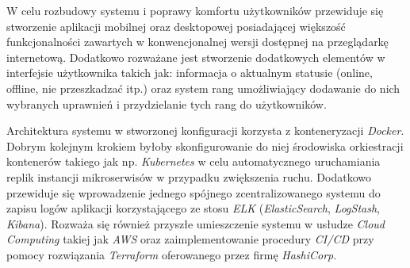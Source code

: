 
W celu rozbudowy systemu i poprawy komfortu użytkowników przewiduje się stworzenie aplikacji mobilnej oraz desktopowej
posiadającej większość funkcjonalności zawartych w konwencjonalnej wersji dostępnej na przeglądarkę internetową.
Dodatkowo rozważane jest stworzenie dodatkowych elementów w interfejsie użytkownika takich jak: informacja o aktualnym
statusie (online, offline, nie przeszkadzać itp.) oraz system rang umożliwiający dodawanie do nich wybranych uprawnień i
przydzielanie tych rang do użytkowników.

Architektura systemu w stworzonej konfiguracji korzysta z konteneryzacji \textit{Docker}. Dobrym kolejnym krokiem byłoby
skonfigurowanie do niej środowiska orkiestracji kontenerów takiego jak np. \textit{Kubernetes} w celu automatycznego
uruchamiania replik instancji mikroserwisów w przypadku zwiększenia ruchu. Dodatkowo przewiduje się wprowadzenie jednego
spójnego zcentralizowanego systemu do zapisu logów aplikacji korzystającego ze stosu \textit{ELK}
(\textit{ElasticSearch}, \textit{LogStash}, \textit{Kibana}). Rozważa się również przyszłe umieszczenie systemu w
usłudze \textit{Cloud Computing} takiej jak \textit{AWS} oraz zaimplementowanie procedury \textit{CI/CD} przy pomocy
rozwiązania \textit{Terraform} oferowanego przez firmę \textit{HashiCorp}.
